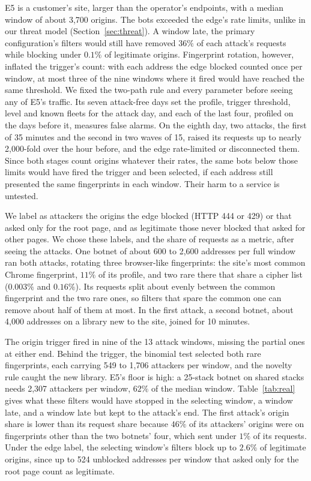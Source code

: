 \documentclass[conference,letterpaper,10pt]{IEEEtran}
\newcommand\1{\textit{(i)}}
\newcommand\2{\textit{(ii)}}
\newcommand\3{\textit{(iii)}}
\newcommand\4{\textit{(iv)}}
\newcommand\5{\textit{(v)}}
\newcommand\6{\textit{(vi)}}
\newcommand\7{\textit{(vii)}}
\newcommand\8{\textit{(viii)}}
\newcommand\9{\textit{(ix)}}
\begin{document}
E5 is a customer's site, larger than the operator's endpoints, with a median window of about 3,700 origins. The bots exceeded the edge's rate limits, unlike in our threat model (Section~\ref{sec:threat}). A window late, the primary configuration's filters would still have removed $36\%$ of each attack's requests while blocking under $0.1\%$ of legitimate origins. Fingerprint rotation, however, inflated the trigger's count: with each address the edge blocked counted once per window, at most three of the nine windows where it fired would have reached the same threshold. We fixed the two-path rule and every parameter before seeing any of E5's traffic. Its seven attack-free days set the profile, trigger threshold, level and known fleets for the attack day, and each of the last four, profiled on the days before it, measures false alarms. On the eighth day, two attacks, the first of 35 minutes and the second in two waves of 15, raised its requests up to nearly 2,000-fold over the hour before, and the edge rate-limited or disconnected them.  Since both stages count origins whatever their rates, the same bots below those limits would have fired the trigger and been selected, if each address still presented the same fingerprints in each window. Their harm to a service is untested.

We label as attackers the origins the edge blocked (HTTP 444 or 429) or that asked only for the root page, and as legitimate those never blocked that asked for other pages. We chose these labels, and the share of requests as a metric, after seeing the attacks. One botnet of about 600 to 2,600 addresses per full window ran both attacks, rotating three browser-like fingerprints: the site's most common Chrome fingerprint, $11\%$ of its profile, and two rare there that share a cipher list ($0.003\%$ and $0.16\%$). Its requests split about evenly between the common fingerprint and the two rare ones, so filters that spare the common one can remove about half of them at most. In the first attack, a second botnet, about 4,000 addresses on a library new to the site, joined for 10 minutes.

The origin trigger fired in nine of the 13 attack windows, missing the partial ones at either end.  Behind the trigger, the binomial test selected both rare fingerprints, each carrying 549 to 1,706 attackers per window, and the novelty rule caught the new library. E5's floor is high: a 25-stack botnet on shared stacks needs 2,307 attackers per window, $62\%$ of the median window. Table~\ref{tab:real} gives what these filters would have stopped in the selecting window, a window late, and a window late but kept to the attack's end. The first attack's origin share is lower than its request share because $46\%$ of its attackers' origins were on fingerprints other than the two botnets' four, which sent under $1\%$ of its requests. Under the edge label, the selecting window's filters block up to $2.6\%$ of legitimate origins, since up to 524 unblocked addresses per window that asked only for the root page count as legitimate.
\end{document}
